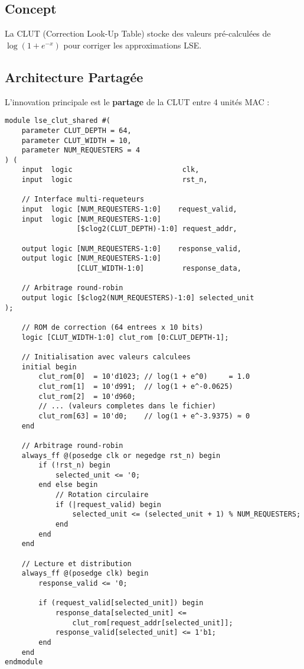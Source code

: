 \documentclass[12pt,a4paper]{article}
\begin{document}
\subsection{Concept}

La CLUT (Correction Look-Up Table) stocke des valeurs pré-calculées de $\log(1 + e^{-x})$ pour corriger les approximations LSE.

\subsection{Architecture Partagée}

L'innovation principale est le \textbf{partage} de la CLUT entre 4 unités MAC :

\begin{lstlisting}[style=verilog, caption={Module lse\_clut\_shared.sv}]
module lse_clut_shared #(
    parameter CLUT_DEPTH = 64,
    parameter CLUT_WIDTH = 10,
    parameter NUM_REQUESTERS = 4
) (
    input  logic                          clk,
    input  logic                          rst_n,
    
    // Interface multi-requeteurs
    input  logic [NUM_REQUESTERS-1:0]    request_valid,
    input  logic [NUM_REQUESTERS-1:0]
                 [$clog2(CLUT_DEPTH)-1:0] request_addr,
    
    output logic [NUM_REQUESTERS-1:0]    response_valid,
    output logic [NUM_REQUESTERS-1:0]
                 [CLUT_WIDTH-1:0]         response_data,
    
    // Arbitrage round-robin
    output logic [$clog2(NUM_REQUESTERS)-1:0] selected_unit
);

    // ROM de correction (64 entrees x 10 bits)
    logic [CLUT_WIDTH-1:0] clut_rom [0:CLUT_DEPTH-1];
    
    // Initialisation avec valeurs calculees
    initial begin
        clut_rom[0]  = 10'd1023; // log(1 + e^0)     = 1.0
        clut_rom[1]  = 10'd991;  // log(1 + e^-0.0625)
        clut_rom[2]  = 10'd960;
        // ... (valeurs completes dans le fichier)
        clut_rom[63] = 10'd0;    // log(1 + e^-3.9375) ≈ 0
    end
    
    // Arbitrage round-robin
    always_ff @(posedge clk or negedge rst_n) begin
        if (!rst_n) begin
            selected_unit <= '0;
        end else begin
            // Rotation circulaire
            if (|request_valid) begin
                selected_unit <= (selected_unit + 1) % NUM_REQUESTERS;
            end
        end
    end
    
    // Lecture et distribution
    always_ff @(posedge clk) begin
        response_valid <= '0;
        
        if (request_valid[selected_unit]) begin
            response_data[selected_unit] <= 
                clut_rom[request_addr[selected_unit]];
            response_valid[selected_unit] <= 1'b1;
        end
    end
endmodule
\end{lstlisting}
\end{document}
